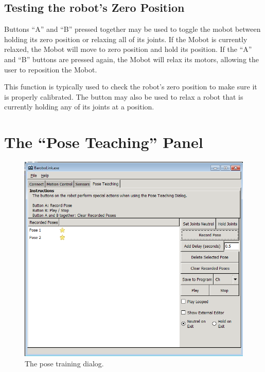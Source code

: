 \documentclass{article}
\begin{document}
\subsection{\label{sec:zeroposition}Testing the robot's Zero Position}
Buttons ``A'' and ``B'' pressed together may be used to toggle the mobot between holding its zero position 
or relaxing all of its joints.  If the Mobot is currently relaxed,
the Mobot will move to zero position and hold its position. If the ``A'' and ``B'' buttons are pressed again, the 
Mobot will relax its motors, allowing the user to reposition the Mobot.

This function is typically used to check the robot's zero position to make sure
it is properly calibrated. The button may also be used to relax a robot that
is currently holding any of its joints at a position.

\section{The ``Pose Teaching'' Panel}
\begin{figure}[H]
\begin{center}
\includegraphics[width=4.5in]{images/posetrain.png}
\end{center}
\caption{\label{fig:posetrain.png} The pose training dialog.}
\end{figure}
\end{document}
